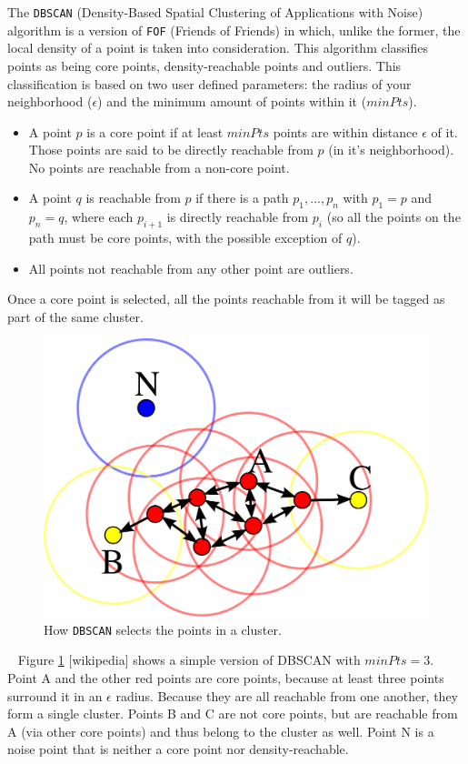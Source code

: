 \documentclass[12pt]{article}
\begin{document}
The \texttt{DBSCAN} (Density-Based Spatial Clustering of Applications with Noise) algorithm is a version of \texttt{FOF} (Friends of Friends) in which, unlike the former, the local density of a point is taken into consideration. This algorithm classifies points as being core points, density-reachable points and outliers. This classification is based on two user defined parameters: the radius of your neighborhood ($\epsilon $) and the minimum amount of points within it ($minPts$). \cite{DBSCAN}

\begin{itemize}
\item A point $p$ is a core point if at least $minPts$ points are within distance $\epsilon$ of it. Those points are said to be directly reachable from $p$ (in it's neighborhood). No points are reachable from a non-core point.
\item A point $q$ is reachable from $p$ if there is a path $p_1, ..., p_n$ with $p_1 = p$ and $p_n = q$, where each $p_{i+1}$ is directly reachable from $p_i $ (so all the points on the path must be core points, with the possible exception of $q$).
\item All points not reachable from any other point are outliers.
\end{itemize}

Once a core point is selected, all the points reachable from it will be tagged as part of the same cluster.

\FloatBarrier

\begin{figure}[h]
\centering
\includegraphics[width=0.8\linewidth]{DBSCAN-Illustration}
\caption{How \texttt{DBSCAN} selects the points in a cluster.}
\label{fig:DBSCAN}
\end{figure}\
\FloatBarrier
Figure \ref{fig:DBSCAN} [wikipedia] shows a simple version of DBSCAN with $minPts = 3$. Point A and the other red points are core points, because at least three points surround it in an $\epsilon$  radius. Because they are all reachable from one another, they form a single cluster. Points B and C are not core points, but are reachable from A (via other core points) and thus belong to the cluster as well. Point N is a noise point that is neither a core point nor density-reachable.
\end{document}
